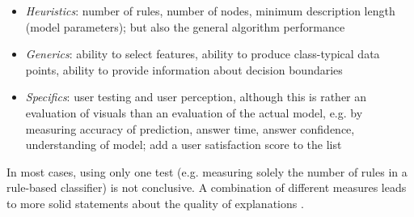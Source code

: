 \begin{itemize}
	\item \textit{Heuristics}: number of rules, number of nodes, minimum description length (model parameters); but also the general algorithm performance \cite{richardson2018survey}
	\item \textit{Generics}: ability to select features, ability to produce class-typical data points, ability to provide information about decision boundaries
	\item \textit{Specifics}: user testing and user perception, although this is rather an evaluation of visuals than an evaluation of the actual model, e.g. by measuring accuracy of prediction, answer time, answer confidence, understanding of model; \cite{richardson2018survey} add a user satisfaction score to the list
\end{itemize}
In most cases, using only one test (e.g. measuring solely the number of rules in a rule-based classifier) is not conclusive. A combination of different measures leads to more solid statements about the quality of explanations \cite{richardson2018survey}.






